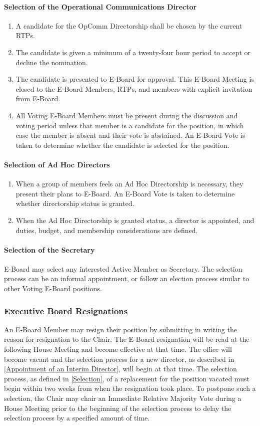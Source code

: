 \documentclass{article}
\newcommand{\asubsection}[1]{\subsubsection{#1} \label{#1}}
\newcommand{\asubsubsection}[1]{\paragraph{#1} \label{#1}}
\begin{document}
\asubsubsection{Selection of the Operational Communications Director}
\renewcommand{\theenumi}{\alph{enumi}} %

\begin{enumerate}
	\item A candidate for the OpComm Directorship shall be chosen by the current RTPs.
	\item The candidate is given a minimum of a twenty-four hour period to accept or decline the nomination.
	\item The candidate is presented to E-Board for approval.
	      This E-Board Meeting is closed to the E-Board Members, RTPs, and members with explicit invitation from E-Board.
	\item All Voting E-Board Members must be present during the discussion and voting period unless that member is a candidate for the position, in which case the member is absent and their vote is abstained.
	      An E-Board Vote is taken to determine whether the candidate is selected for the position.
\end{enumerate}

\asubsubsection{Selection of Ad Hoc Directors}
\begin{enumerate}
	\item When a group of members feels an Ad Hoc Directorship is necessary, they present their plans to E-Board.
	      An E-Board Vote is taken to determine whether directorship status is granted.
	\item When the Ad Hoc Directorship is granted status, a director is appointed, and duties, budget, and membership considerations are defined.
\end{enumerate}

\asubsubsection{Selection of the Secretary}
E-Board may select any interested Active Member as Secretary.
The selection process can be an informal appointment, or follow an election process similar to other Voting E-Board positions.

\asubsection{Executive Board Resignations}
An E-Board Member may resign their position by submitting in writing the reason for resignation to the Chair.
The E-Board resignation will be read at the following House Meeting and become effective at that time.
The office will become vacant and the selection process for a new director, as described in \ref{Appointment of an Interim Director}, will begin at that time.
The selection process, as defined in \ref{Selection}, of a replacement for the position vacated must begin within two weeks from when the resignation took place.
To postpone such a selection, the Chair may chair an Immediate Relative Majority Vote during a House Meeting prior to the beginning of the selection process to delay the selection process by a specified amount of time.
\end{document}
